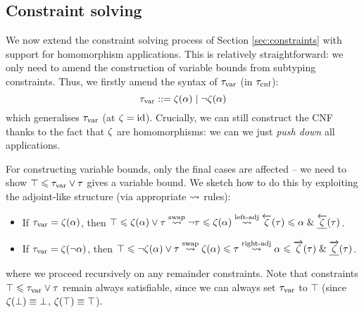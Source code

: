 \subsection{Constraint solving}

We now extend the constraint solving process of Section \ref{sec:constraints} with support for homomorphism applications. This is relatively straightforward: we only need to amend the construction of variable bounds from subtyping constraints. Thus, we firstly amend the syntax of $\tau_\text{var}$ (in $\tau_\text{cnf}$):
$$ \tau_\text{var} ::= \zeta(\alpha) \mid \lnot  \zeta(\alpha) $$
which generalises $\tau_\text{var}$ (at $\zeta = \mathrm{id}$).
Crucially, we can still construct the CNF thanks to the fact that $\zeta$ are homomorphisms: we can we just \emph{push down} all applications.

For constructing variable bounds, only the final cases are affected -- we need to show $\top \leqslant \tau_\text{var} \lor \tau$ gives a variable bound. We sketch how to do this by exploiting the adjoint-like structure (via appropriate $\leadsto$ rules):
\begin{itemize}
    \item If $\tau_\text{var} = \zeta(\alpha)$, then $\top \leqslant \zeta(\alpha) \lor \tau \stackrel{\text{swap}}{\leadsto} \lnot \tau \leqslant \zeta(\alpha) \stackrel{\text{left-adj}}{\leadsto} \overleftarrow{\zeta}(\tau) \leqslant \alpha \;\&\; \underline{\overleftarrow{\zeta}}(\tau) $.
    \item If $\tau_\text{var} = \zeta(\lnot \alpha)$, then $\top \leqslant \lnot \zeta(\alpha) \lor \tau \stackrel{\text{swap}}{\leadsto} \zeta(\alpha) \leqslant \tau \stackrel{\text{right-adj}}{\leadsto} \alpha \leqslant \overrightarrow{\zeta}(\tau) \;\&\; \underline{\overrightarrow{\zeta}}(\tau)$.
\end{itemize}
where we proceed recursively on any remainder constraints. 
Note that constraints $\top \leqslant \tau_\text{var} \lor \tau$ remain always satisfiable, since we can always set $\tau_\text{var}$ to $\top$ (since $\zeta(\bot) \equiv \bot$, $\zeta(\top) \equiv \top$).

